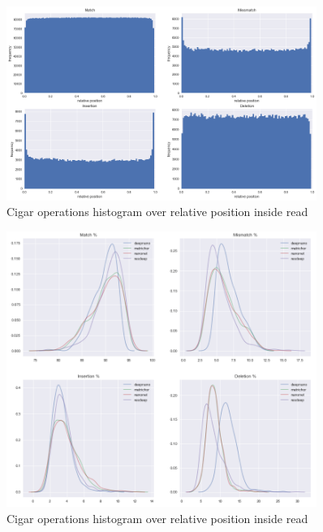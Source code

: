 \documentclass[times, utf8, diplomski, numeric, english]{fer}
\begin{document}
\begin{figure}[!ht]
	\begin{center}
		\includegraphics[width=0.9\textwidth]{./imgs/operation_distributed_r9.png}
		\caption{Cigar operations histogram over relative position inside read}
		\label{fg:cigar_op_dist}
	\end{center}
\end{figure}



\begin{figure}[!ht]
	\begin{center}
		\includegraphics[width=0.9\textwidth]{./imgs/results/ecoli/kde_cigar.png}
		\caption{Cigar operations histogram over relative position inside read}
		\label{fg:ecoli_kde}
	\end{center}
\end{figure}
\end{document}
